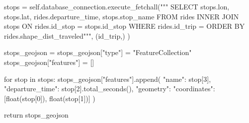 \begin{code}[frame=none]
stops = self.database_connection.execute_fetchall("""
SELECT
  stops.lon,
  stops.lat,
  rides.departure_time,
  stops.stop_name
FROM rides
INNER JOIN stops ON rides.id_stop = stops.id_stop
WHERE rides.id_trip = %
ORDER BY rides.shape_dist_traveled""",
(id_trip,)
)

stops_geojson = {}
stops_geojson["type"] = "FeatureCollection"
stops_geojson["features"] = []

for stop in stops:
stops_geojson["features"].append({
  "name": stop[3],
  "departure_time": stop[2].total_seconds(),
  "geometry": {
    "coordinates": [float(stop[0]), float(stop[1])]
  }
})

return stops_geojson
\end{code}



















